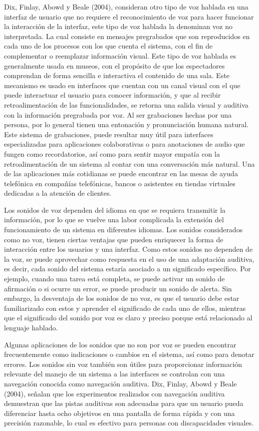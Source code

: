 Dix, Finlay, Abowd y Beale (2004), consideran otro tipo de voz hablada en una interfaz de usuario que no requiere el reconocimiento de voz para hacer funcionar la interacción de la interfaz, este tipo de voz hablada la denominan voz no interpretada. La cual consiste en mensajes pregrabados que son reproducidos en cada uno de los procesos con los que cuenta el sistema, con el fin de complementar o reemplazar información visual. Este tipo de voz hablada es generalmente usada en museos, con el propósito de que los espectadores comprendan de forma sencilla e interactiva el contenido de una sala. Este mecanismo es usado en interfaces que cuentan con un canal visual con el que puede interactuar el usuario para conocer información, y que al recibir retroalimentación de las funcionalidades, se retorna una salida visual y auditiva con la información pregrabada por voz. Al ser grabaciones hechas por una persona, por lo general tienen una entonación y pronunciación humana natural. Este sistema de grabaciones, puede resultar muy útil para interfaces especializadas para aplicaciones colaborativas o para anotaciones de audio que fungen como recordatorios, así como para sentir mayor empatía con la retroalimentación de un sistema al contar con una conversación más natural. Una de las aplicaciones más cotidianas se puede encontrar en las mesas de ayuda telefónica en compañías telefónicas, bancos o asistentes en tiendas virtuales dedicadas a la atención de clientes.

Los sonidos de voz dependen del idioma en que se requiera transmitir la información, por lo que se vuelve una labor complicada la extensión del funcionamiento de un sistema en diferentes idiomas. Los sonidos considerados como no voz, tienen ciertas ventajas que pueden enriquecer la forma de interacción entre los usuarios y una interfaz. Como estos sonidos no dependen de la voz, se puede aprovechar como respuesta en el uso de una adaptación auditiva, es decir, cada sonido del sistema estaría asociado a un significado específico. Por ejemplo, cuando una tarea está completa, se puede activar un sonido de afirmación o si ocurre un error, se puede producir un sonido de alerta. Sin embargo, la desventaja de los sonidos de no voz, es que el usuario debe estar familiarizado con estos y aprender el significado de cada uno de ellos, mientras que el significado del sonido por voz es claro y preciso porque está relacionado al lenguaje hablado.

Algunas aplicaciones de los sonidos que no son por voz se pueden encontrar frecuentemente como indicaciones o cambios en el sistema, así como para denotar errores. Los sonidos sin voz también son útiles para proporcionar información relevante del manejo de un sistema a las interfaces se controlan con una navegación conocida como navegación auditiva. Dix, Finlay, Abowd y Beale (2004), señalan que los experimentos realizados con navegación auditiva demuestran que las pistas auditivas son adecuadas para que un usuario pueda diferenciar hasta ocho objetivos en una pantalla de forma rápida y con una precisión razonable, lo cual es efectivo para personas con discapacidades visuales.

